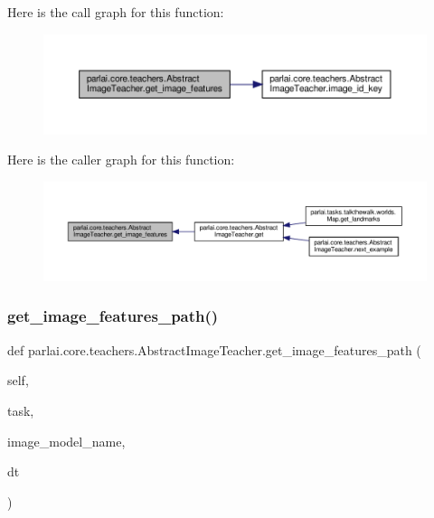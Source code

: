 Here is the call graph for this function\+:
\nopagebreak
\begin{figure}[H]
\begin{center}
\leavevmode
\includegraphics[width=350pt]{classparlai_1_1core_1_1teachers_1_1AbstractImageTeacher_a3e1f85a8de230d8733272bd1e860cd92_cgraph}
\end{center}
\end{figure}
Here is the caller graph for this function\+:
\nopagebreak
\begin{figure}[H]
\begin{center}
\leavevmode
\includegraphics[width=350pt]{classparlai_1_1core_1_1teachers_1_1AbstractImageTeacher_a3e1f85a8de230d8733272bd1e860cd92_icgraph}
\end{center}
\end{figure}
\mbox{\label{classparlai_1_1core_1_1teachers_1_1AbstractImageTeacher_a29fce019ea9795947235ba208aa4bfb0}} 
\subsubsection{\texorpdfstring{get\+\_\+image\+\_\+features\+\_\+path()}{get\_image\_features\_path()}}
{\footnotesize\ttfamily def parlai.\+core.\+teachers.\+Abstract\+Image\+Teacher.\+get\+\_\+image\+\_\+features\+\_\+path (\begin{DoxyParamCaption}\item[{}]{self,  }\item[{}]{task,  }\item[{}]{image\+\_\+model\+\_\+name,  }\item[{}]{dt }\end{DoxyParamCaption})}

